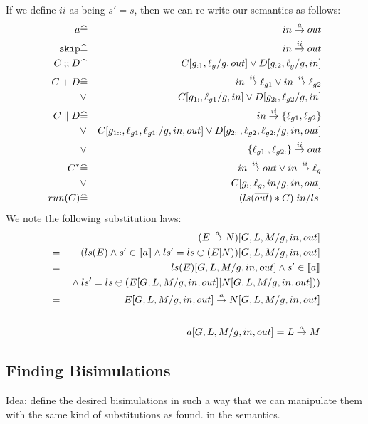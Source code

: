 If we define $ii$ as being  $s'=s$,
then we can re-write our semantics as follows:
\begin{eqnarray*}
   a
   &\widehat=&
   in \stackrel{a}{\rightarrow} out
\\ \texttt{skip}
   &\widehat=&
   in \stackrel{ii}{\rightarrow} out
\\ C \mathbin{;\!;} D
   &\widehat=&
   C[g_{:1},\ell_g/g,out] \lor D[g_{:2},\ell_g/g,in]
\\ C + D
   &\widehat=&
   in \stackrel{ii}{\rightarrow} \ell_{g1} \lor in \stackrel{ii}{\rightarrow} \ell_{g2}
\\ &\lor&
   C[g_{1:},\ell_{g1}/g,in] \lor D[g_{2:},\ell_{g2}/g,in]
\\ C \parallel D
   &\widehat=&
   in \stackrel{ii}{\rightarrow} \{\ell_{g1},\ell_{g2}\}
\\ &\lor&
   C[g_{1::},\ell_{g1},\ell_{g1:}/g,in,out]
   \lor D[g_{2::},\ell_{g2},\ell_{g2:}/g,in,out]
\\ &\lor&
   \{\ell_{g1:},\ell_{g2:}\}
   \stackrel{ii}{\rightarrow}
   out
\\ C^*
   &\widehat=&
   in \stackrel{ii}{\rightarrow} out
   \lor
   in \stackrel{ii}{\rightarrow} \ell_g
\\ &\lor&
   C[g_{:},\ell_g,in/g,in,out]
\\ run(C)
   &\widehat=&
   ( ls(\overline{out}) * C)[in/ls]
\end{eqnarray*}
We note the following substitution laws:
\begin{eqnarray*}
  && (E \stackrel{a}{\rightarrow} N)[G,L,M/g,in,out]
\\&=& (ls(E) \land s' \in [\![{a}]\!] \land ls'=ls\ominus(E|N))[G,L,M/g,in,out]
\\&=& ls(E)[G,L,M/g,in,out]
       \land s' \in [\![{a}]\!]
\\&& {}\land ls'=ls\ominus(E[G,L,M/g,in,out]|N[G,L,M/g,in,out]))
\\&=& E[G,L,M/g,in,out] \stackrel{a}{\rightarrow} N[G,L,M/g,in,out]
\\
\\&& a[G,L,M/g,in,out] = L \stackrel{a}{\rightarrow} M
\end{eqnarray*}

\subsection{Finding Bisimulations}


Idea: define the desired bisimulations in such a way that
we can manipulate them with the same kind of substitutions as found. in
the semantics.

\subsubsection{}

